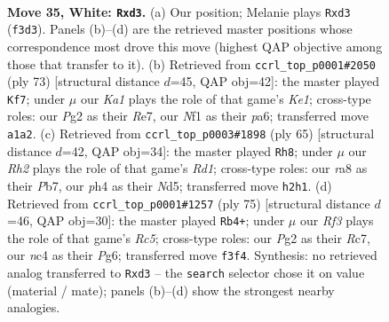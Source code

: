 \documentclass[11pt]{article}
\begin{document}
\clearpage

\begin{figure}[p]\centering
\begin{subfigure}{0.46\textwidth}\centering
\resizebox{\linewidth}{!}{%
\newchessgame
\chessboard[
  setfen={r1b1k3/8/8/1r6/p1n4p/3p1R1P/6PR/K4N2 w q - 0 35},
  showmover=false,
  pgfstyle=straightmove, color=movearrow, markmove={f3-d3}
]}
\caption{}
\end{subfigure}\hfill
\begin{subfigure}{0.46\textwidth}\centering
\resizebox{\linewidth}{!}{%
\newchessgame
\chessboard[
  setfen={4k3/p3r3/P3n3/2p3P1/1p3P1R/3r4/6P1/1NR3K1 b - - 2 37},
  showmover=false,
  pgfstyle=straightmove, color=movearrow, markmove={e8-f7}
]}
\caption{}
\end{subfigure}
\\[4pt]
\begin{subfigure}{0.46\textwidth}\centering
\resizebox{\linewidth}{!}{%
\newchessgame
\chessboard[
  setfen={2kr4/1p6/p4p2/3n4/3P2rp/8/PP1BR1P1/5R1K b - - 1 33},
  showmover=false,
  pgfstyle=straightmove, color=movearrow, markmove={d8-h8}
]}
\caption{}
\end{subfigure}\hfill
\begin{subfigure}{0.46\textwidth}\centering
\resizebox{\linewidth}{!}{%
\newchessgame
\chessboard[
  setfen={8/2r5/5kp1/3R1p2/2r4p/7P/1KP1RPP1/8 b - - 3 38},
  showmover=false,
  pgfstyle=straightmove, color=movearrow, markmove={c4-b4}
]}
\caption{}
\end{subfigure}
\caption{\textbf{Move 35, White: \texttt{Rxd3}.} (a) Our position; Melanie plays \texttt{Rxd3} (\texttt{f3d3}). Panels (b)--(d) are the retrieved master positions whose correspondence most drove this move (highest QAP objective among those that transfer to it). (b) Retrieved from \texttt{ccrl\_top\_p0001\#2050} (ply 73) [structural distance $d$=45, QAP obj=42]: the master played \texttt{Kf7}; under $\mu$ our \emph{Ka1} plays the role of that game's \emph{Ke1}; cross-type roles: our \emph{P}g2 as their \emph{R}e7, our \emph{N}f1 as their \emph{p}a6; transferred move \texttt{a1a2}. (c) Retrieved from \texttt{ccrl\_top\_p0003\#1898} (ply 65) [structural distance $d$=42, QAP obj=34]: the master played \texttt{Rh8}; under $\mu$ our \emph{Rh2} plays the role of that game's \emph{Rd1}; cross-type roles: our \emph{r}a8 as their \emph{P}b7, our \emph{p}h4 as their \emph{N}d5; transferred move \texttt{h2h1}. (d) Retrieved from \texttt{ccrl\_top\_p0001\#1257} (ply 75) [structural distance $d$=46, QAP obj=30]: the master played \texttt{Rb4+}; under $\mu$ our \emph{Rf3} plays the role of that game's \emph{Rc5}; cross-type roles: our \emph{P}g2 as their \emph{R}c7, our \emph{n}c4 as their \emph{P}g6; transferred move \texttt{f3f4}. Synthesis: no retrieved analog transferred to \texttt{Rxd3} -- the \texttt{search} selector chose it on value (material / mate); panels (b)--(d) show the strongest nearby analogies.}
\label{fig:thought-m68}
\end{figure}
\end{document}

